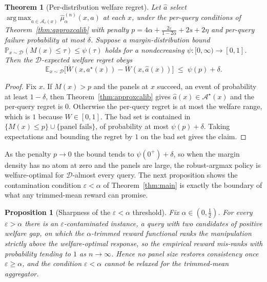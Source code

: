 \documentclass[11pt]{article}
\theoremstyle{plain}
\newtheorem{theorem}{Theorem}
\newtheorem{proposition}{Proposition}
\theoremstyle{definition}
\theoremstyle{remark}
\newcommand{\E}{\mathbb{E}}
\newcommand{\Prob}{\mathbb{P}}
\newcommand{\Ac}{\mathcal{A}}
\newcommand{\Dc}{\mathcal{D}}
\newcommand{\Wbar}{\overline{W}}
\newcommand{\eps}{\varepsilon}
\DeclareMathOperator*{\argmax}{arg\,max}
\begin{document}
\begin{theorem}[Per-distribution welfare regret]
\label{thm:dist}
Let $\hat a$ select $\argmax_{a\in\Ac_c(x)}\hat\mu_\alpha^{(n)}(x,a)$ at each $x$, under the
per-query conditions of Theorem~\ref{thm:approxcalib} with penalty
$p=4\alpha+\frac{2\eps}{1-2\alpha}+2s+2\eta$ and per-query failure probability at most $\delta$.
Suppose a margin-distribution bound $\Prob_{x\sim\Dc}(M(x)\le\tau)\le\psi(\tau)$ holds for a
nondecreasing $\psi:[0,\infty)\to[0,1]$. Then the $\Dc$-expected welfare regret obeys
\[
  \E_{x\sim\Dc}\bigl[\Wbar(x,a^\star(x))-\Wbar(x,\hat a(x))\bigr]\;\le\;\psi(p)+\delta.
\]
\end{theorem}

\begin{proof}
Fix $x$. If $M(x)>p$ and the panels at $x$ succeed, an event of probability at least $1-\delta$,
then Theorem~\ref{thm:approxcalib} gives $\hat a(x)\in\Ac^\star(x)$ and the per-query regret is $0$.
Otherwise the per-query regret is at most the welfare range, which is $1$ because $W\in[0,1]$. The
bad set is contained in $\{M(x)\le p\}\cup\{\text{panel fails}\}$, of probability at most
$\psi(p)+\delta$. Taking expectations and bounding the regret by $1$ on the bad set gives the
claim.
\end{proof}

As the penalty $p\to0$ the bound tends to $\psi(0^+)+\delta$, so when the margin density has no
atom at zero and the panels are large, the robust-argmax policy is welfare-optimal for
$\Dc$-almost every query. The next proposition shows the contamination condition $\eps<\alpha$ of
Theorem~\ref{thm:main} is exactly the boundary of what any trimmed-mean reward can promise.

\begin{proposition}[Sharpness of the $\eps<\alpha$ threshold]
\label{prop:sharp}
Fix $\alpha\in(0,\tfrac12)$. For every $\eps>\alpha$ there is an $\eps$-contaminated instance, a
query with two candidates of positive welfare gap, on which the $\alpha$-trimmed reward functional
ranks the manipulation strictly above the welfare-optimal response, so the empirical reward
mis-ranks with probability tending to $1$ as $n\to\infty$. Hence no panel size restores consistency
once $\eps\ge\alpha$, and the condition $\eps<\alpha$ cannot be relaxed for the trimmed-mean
aggregator.
\end{proposition}
\end{document}
